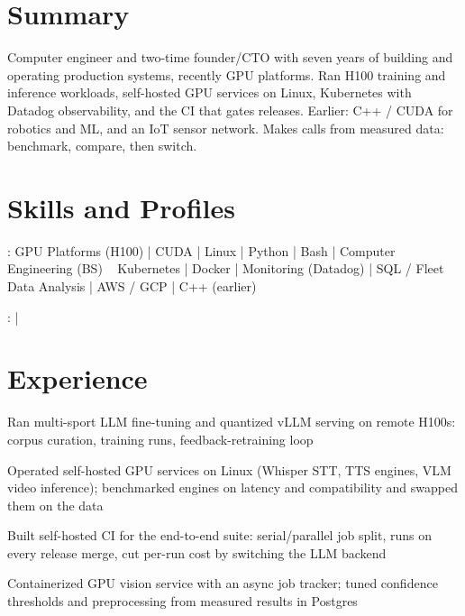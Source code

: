 \documentclass[print]{jack-resume}
\begin{document}
\pagecolor{darkmodeBackground}


\begin{minipage}[t][1cm][t]{.03\textwidth}
    \hfill
\end{minipage}

\section{Summary}
Computer engineer and two-time founder/CTO with seven years of building and operating production systems, recently GPU platforms. Ran H100 training and inference workloads, self-hosted GPU services on Linux, Kubernetes with Datadog observability, and the CI that gates releases. Earlier: C++ / CUDA for robotics and ML, and an IoT sensor network. Makes calls from measured data: benchmark, compare, then switch.
\sectionsep

\section{Skills and Profiles}
:
GPU Platforms (H100) \hfill | \hfill
CUDA \hfill | \hfill
Linux \hfill | \hfill
Python \hfill | \hfill
Bash \hfill | \hfill
Computer Engineering (BS) \
\hspace{1.0cm} Kubernetes \hfill | \hfill
Docker \hfill | \hfill
Monitoring (Datadog) \hfill | \hfill
SQL / Fleet Data Analysis \hfill | \hfill
AWS / GCP \hfill | \hfill
C++ (earlier) \

\raggedright{
    :
      \href{https://www.linkedin.com/in/jack-sturtevant/}{ \ExternalLink} |
    \custombold{Github} \href{https://github.com/jacksturt}{\custombold{jacksturt} \ExternalLink}}

\section{Experience}

\begin{tightemize}
    \item Ran multi-sport LLM fine-tuning and quantized vLLM serving on remote H100s: corpus curation, training runs, feedback-retraining loop
    \item Operated self-hosted GPU services on Linux (Whisper STT, TTS engines, VLM video inference); benchmarked engines on latency and compatibility and swapped them on the data
    \item Built self-hosted CI for the end-to-end suite: serial/parallel job split, runs on every release merge, cut per-run cost by switching the LLM backend
    \item Containerized GPU vision service with an async job tracker; tuned confidence thresholds and preprocessing from measured results in Postgres
\end{tightemize}
\sectionsep
\end{document}
